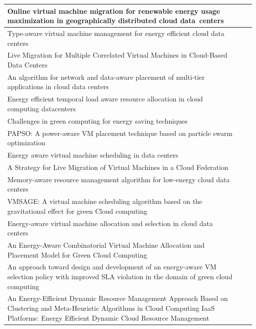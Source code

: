 \documentclass[
	12pt,				%
	oneside,			%
	a4paper,			%
	english,			%
	brazil				%
	]{abntex2ppgsi}
\begin{document}
\begin{apendicesenv}
\begin{longtable}{|p{3in}|p{2in}|p{1in}|}
	\hline
	Online virtual machine migration for renewable energy usage maximization in geographically distributed cloud data centers & \citeonline{Khosravi2017} \\
	\hline
	Type-aware virtual machine management for energy efficient cloud data centers & \citeonline{Al-Dulaimy2018185} \\
	\hline
	Live Migration for Multiple Correlated Virtual Machines in Cloud-Based Data Centers & \citeonline{Sun2018279} \\
	\hline
	An algorithm for network and data-aware placement of multi-tier applications in cloud data centers & \citeonline{Ferdaus201765} \\
	\hline
	Energy efficient temporal load aware resource allocation in cloud computing datacenters & \citeonline{Vakilinia2018} \\
	\hline
	Challenges in green computing for energy saving techniques & \citeonline{More201773} \\
	\hline
	PAPSO: A power-aware VM placement technique based on particle swarm optimization & \citeonline{Ibrahim202081747} \\
	\hline
	Energy aware virtual machine scheduling in data centers & \citeonline{Qiu2019} \\
	\hline
	A Strategy for Live Migration of Virtual Machines in a Cloud Federation & \citeonline{Addya20192877} \\
	\hline
	Memory-aware resource management algorithm for low-energy cloud data centers & \citeonline{Liang2020329} \\
	\hline
	VMSAGE: A virtual machine scheduling algorithm based on the gravitational effect for green Cloud computing & \citeonline{Xu201987} \\
	\hline
	Energy-aware virtual machine allocation and selection in cloud data centers & \citeonline{DineshReddy20191917} \\
	\hline
	An Energy-Aware Combinatorial Virtual Machine Allocation and Placement Model for Green Cloud Computing & \citeonline{Gamsiz202118625} \\
	\hline
	An approach toward design and development of an energy-aware VM selection policy with improved SLA violation in the domain of green cloud computing & \citeonline{Mandal20207374} \\
	\hline
	An Energy-Efficient Dynamic Resource Management Approach Based on Clustering and Meta-Heuristic Algorithms in Cloud Computing IaaS Platforms: Energy Efficient Dynamic Cloud Resource Management & \citeonline{AskarizadeHaghighi20191367} \\

\end{longtable}
\end{apendicesenv}
\end{document}

